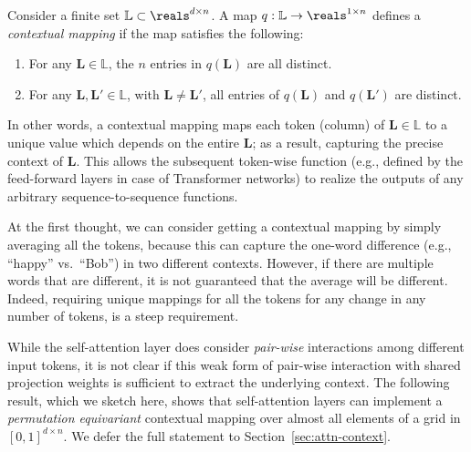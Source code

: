 \documentclass{article} %
\def\mL{{\bm{L}}}
\def\sL{{\mathbb{L}}}
\begin{document}


\begin{definition}
\label{def:context-mapping}
Consider a finite set $\sL \subset \reals^{d \times n}$.
A map $q: \sL \to \reals^{1 \times n}$ defines a {\em contextual mapping} if the map satisfies the following:
\begin{enumerate}[\hspace{5pt}1.]
\setlength{\itemsep}{-3pt}
    \item For any $\mL \in \sL$, the $n$ entries in $q(\mL)$ are all distinct.
    \item For any $\mL, \mL' \in \sL$, with $\mL \neq \mL'$, all entries of $q(\mL)$ and $q(\mL')$ are distinct.
\end{enumerate}
\end{definition}
In other words, a contextual mapping maps each token (column) of $\mL \in \sL$ to a unique value which depends on the entire $\mL$; as a result, capturing the precise context of $\mL$. This allows the subsequent token-wise function (e.g., defined by the feed-forward layers in case of Transformer networks) to realize the outputs of any arbitrary sequence-to-sequence functions. 

At the first thought, we can consider getting a contextual mapping by simply averaging all the tokens, because this can capture the one-word difference (e.g., ``happy'' vs.\ ``Bob'') in two different contexts. However, if there are multiple words that are different, it is not guaranteed that the average will be different. Indeed, requiring unique mappings for all the tokens for any change in any number of tokens, is a steep requirement. 

While the self-attention layer does consider {\em pair-wise} interactions among different input tokens, it is not clear if this weak form of pair-wise interaction with shared projection weights is sufficient to extract the underlying context. The following result, which we sketch here, shows that self-attention layers can implement a \emph{permutation equivariant} contextual mapping over almost all elements of a grid in $[0,1]^{d \times n}$. We defer the full statement to Section~\ref{sec:attn-context}.
\end{document}

